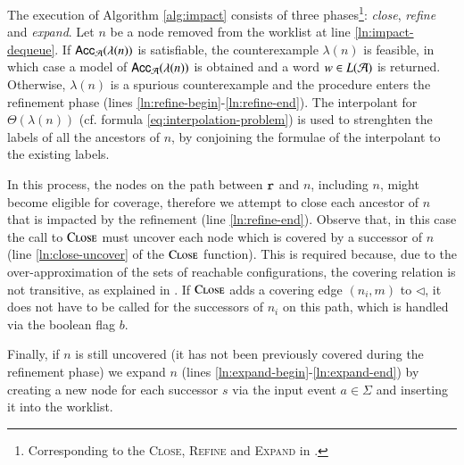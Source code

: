 \documentclass[10pt,conference,letterpaper,twocolumn]{IEEEtran}
\begin{document}
The execution of Algorithm \ref{alg:impact} consists of three
phases\footnote{Corresponding to the \textsc{Close}, \textsc{Refine}
  and \textsc{Expand} in \cite{mcmillan06}.}: \emph{close},
\emph{refine} and \emph{expand}. Let $n$ be a node removed from the
worklist at line \ref{ln:impact-dequeue}. If $\mathsf{Acc}_{\mathcal{A}}(\lambda(n))$
is satisfiable, the counterexample $\lambda(n)$ is feasible, in which
case a model of $\mathsf{Acc}_{\mathcal{A}}(\lambda(n))$ is obtained and a word $w
\in L(\mathcal{A})$ is returned. Otherwise, $\lambda(n)$ is a spurious
counterexample and the procedure enters the refinement phase (lines
\ref{ln:refine-begin}-\ref{ln:refine-end}). The interpolant for
$\Theta(\lambda(n))$ (cf. formula \ref{eq:interpolation-problem}) is
used to strenghten the labels of all the ancestors of $n$, by
conjoining the formulae of the interpolant to the existing labels.

In this process, the nodes on the path between $\mathtt{r}$ and $n$,
including $n$, might become eligible for coverage, therefore we
attempt to close each ancestor of $n$ that is impacted by the
refinement (line \ref{ln:refine-end}). Observe that, in this case the
call to $\Call{Close}{}$ must uncover each node which is covered by a
successor of $n$ (line \ref{ln:close-uncover} of the $\Call{Close}{}$
function). This is required because, due to the over-approximation of
the sets of reachable configurations, the covering relation is not
transitive, as explained in \cite{mcmillan06}. If $\Call{Close}{}$
adds a covering edge $(n_i,m)$ to $\lhd$, it does not have to be
called for the successors of $n_i$ on this path, which is handled via
the boolean flag $b$.

Finally, if $n$ is still uncovered (it has not been previously covered
during the refinement phase) we expand $n$ (lines
\ref{ln:expand-begin}-\ref{ln:expand-end}) by creating a new node for
each successor $s$ via the input event $a \in \Sigma$ and inserting it
into the worklist.
\end{document}
